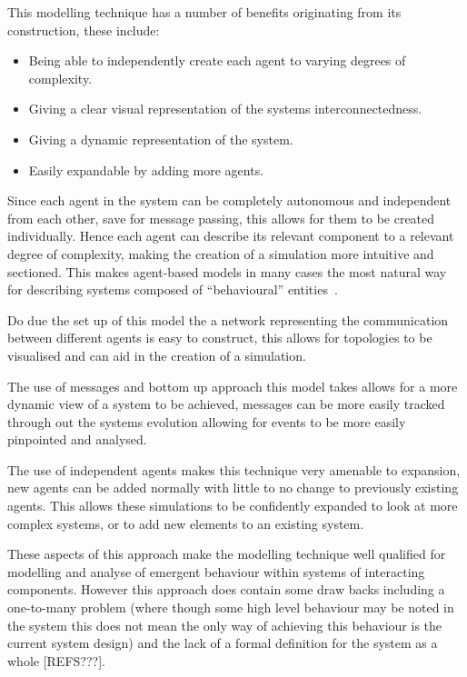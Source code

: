 \documentclass{article}
\begin{document}
This modelling technique has a number of benefits originating from its construction, these include:
\begin{itemize}
   \item Being able to independently create each agent to varying degrees of complexity. 
   \item Giving a clear visual representation of the systems interconnectedness.
   \item Giving a dynamic representation of the system.
   \item Easily expandable by adding more agents.  
\end{itemize} 

Since each agent in the system can be completely autonomous and independent from each other, save for message passing, this allows for them to be created individually. Hence each agent can describe its relevant component to a relevant degree of complexity, making the creation of a simulation more intuitive and sectioned. This makes agent-based models in many cases the most natural way for describing systems composed of ``behavioural'' entities~\cite{techsadsProbsabm}.

Do due the set up of this model the a network representing the communication between different agents is easy to construct, this allows for topologies to be visualised and can aid in the creation of a simulation.    

The use of messages and bottom up approach this model takes allows for a more dynamic view of a system to be achieved, messages can be more easily tracked through out the systems evolution allowing for events to be more easily pinpointed and analysed.  

The use of independent agents makes this technique very amenable to expansion, new agents can be added normally with little to no change to previously existing agents. This allows these simulations to be confidently expanded to look at more complex systems, or to add new elements to an existing system.  

These aspects of this approach make the modelling technique well qualified for modelling and analyse of emergent behaviour within systems of interacting components. However this approach does contain some draw backs including a one-to-many problem (where though some high level behaviour may be noted in the system this does not mean the only way of achieving this behaviour is the current system design) and the lack of a formal definition for the system as a whole [REFS???].  
\end{document}
